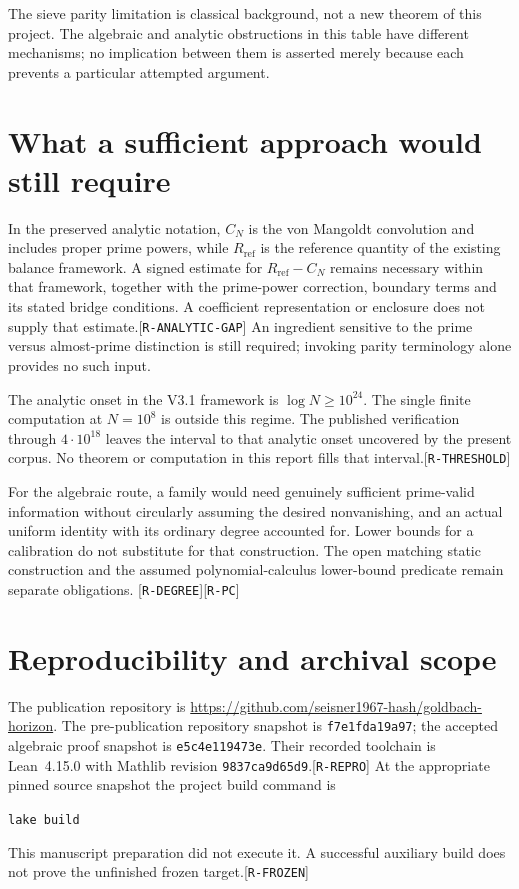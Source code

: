 \documentclass[11pt]{article}
\newcommand{\ev}[1]{{\scriptsize[\nolinkurl{#1}]}}
\theoremstyle{remark}
\begin{document}
The sieve parity limitation is classical background, not a new theorem of
this project.\cite{selberg1949}
The algebraic and analytic obstructions in this table have different
mechanisms; no implication between them is asserted merely because each
prevents a particular attempted argument.



\section{What a sufficient approach would still require}
In the preserved analytic notation, $C_N$ is the von Mangoldt convolution
and includes proper prime powers, while $R_{\mathrm{ref}}$ is the reference
quantity of the existing balance framework. A signed estimate for
$R_{\mathrm{ref}}-C_N$ remains necessary within that framework, together
with the prime-power correction, boundary terms and its stated bridge
conditions. A coefficient representation or enclosure does not supply
that estimate.\ev{R-ANALYTIC-GAP}
An ingredient sensitive to the prime versus almost-prime distinction is
still required; invoking parity terminology alone provides no such input.

The analytic onset in the V3.1 framework is $\log N\ge10^{24}$.
The single finite computation at $N=10^8$ is outside this regime. The
published verification through $4\cdot10^{18}$ leaves the interval to that
analytic onset uncovered by the present corpus. No theorem or computation
in this report fills that interval.\ev{R-THRESHOLD}\cite{osilva2014}

For the algebraic route, a family would need genuinely sufficient
prime-valid information without circularly assuming the desired
nonvanishing, and an actual uniform identity with its ordinary degree
accounted for. Lower bounds for a calibration do not substitute for that
construction. The open matching static construction and the assumed
polynomial-calculus lower-bound predicate remain separate obligations.
\ev{R-DEGREE}\ev{R-PC}

\section{Reproducibility and archival scope}
The publication repository is
\url{https://github.com/seisner1967-hash/goldbach-horizon}.
The pre-publication repository snapshot is \texttt{f7e1fda19a97}; the
accepted algebraic proof snapshot is \texttt{e5c4e119473e}.
Their recorded toolchain is Lean~4.15.0 with Mathlib revision
\texttt{9837ca9d65d9}.\ev{R-REPRO}
At the appropriate pinned source snapshot the project build command is
\begin{center}\texttt{lake build}\end{center}
This manuscript preparation did not execute it. A successful auxiliary
build does not prove the unfinished frozen target.\ev{R-FROZEN}
\end{document}
